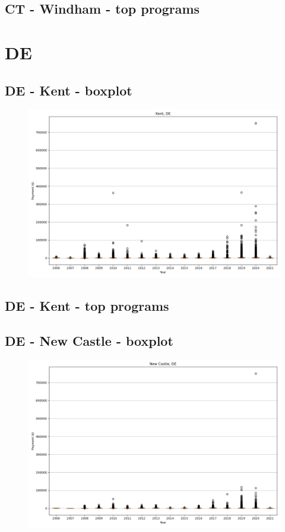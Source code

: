 \subsection*{CT - Windham - top programs}

\newpage
\section*{DE}
\subsection*{DE - Kent - boxplot}
\begin{figure}[h]
\centering
\includegraphics[width=7in]{../output/boxplots/counties/Kent-DE_boxplot.png}
\end{figure}


\subsection*{DE - Kent - top programs}

\newpage
\subsection*{DE - New Castle - boxplot}
\begin{figure}[h]
\centering
\includegraphics[width=7in]{../output/boxplots/counties/New Castle-DE_boxplot.png}
\end{figure}


